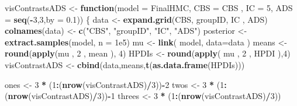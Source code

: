 \documentclass[10pt,dvipsnames,enabledeprecatedfontcommands]{scrartcl}
\newenvironment{Shaded}{\begin{snugshade}}{\end{snugshade}}
\newcommand{\KeywordTok}[1]{\textcolor[rgb]{0.13,0.29,0.53}{\textbf{#1}}}
\newcommand{\DataTypeTok}[1]{\textcolor[rgb]{0.13,0.29,0.53}{#1}}
\newcommand{\DecValTok}[1]{\textcolor[rgb]{0.00,0.00,0.81}{#1}}
\newcommand{\FloatTok}[1]{\textcolor[rgb]{0.00,0.00,0.81}{#1}}
\newcommand{\StringTok}[1]{\textcolor[rgb]{0.31,0.60,0.02}{#1}}
\newcommand{\ControlFlowTok}[1]{\textcolor[rgb]{0.13,0.29,0.53}{\textbf{#1}}}
\newcommand{\OperatorTok}[1]{\textcolor[rgb]{0.81,0.36,0.00}{\textbf{#1}}}
\newcommand{\NormalTok}[1]{#1}
\begin{document}
\begin{Shaded}
\begin{Highlighting}[]
\NormalTok{visContrastsADS <-}\StringTok{ }\ControlFlowTok{function}\NormalTok{(}\DataTypeTok{model =}\NormalTok{ FinalHMC, }\DataTypeTok{CBS =}\NormalTok{ CBS , }\DataTypeTok{IC =}  \DecValTok{5}\NormalTok{, }
                            \DataTypeTok{ADS =} \KeywordTok{seq}\NormalTok{(}\OperatorTok{-}\DecValTok{3}\NormalTok{,}\DecValTok{3}\NormalTok{,}\DataTypeTok{by  =} \FloatTok{0.1}\NormalTok{))}
\NormalTok{\{}
\NormalTok{  data <-}\StringTok{ }\KeywordTok{expand.grid}\NormalTok{(CBS, groupID, IC , ADS)}
  \KeywordTok{colnames}\NormalTok{(data) <-}\StringTok{ }\KeywordTok{c}\NormalTok{(}\StringTok{"CBS"}\NormalTok{, }\StringTok{"groupID"}\NormalTok{, }\StringTok{"IC"}\NormalTok{, }\StringTok{"ADS"}\NormalTok{)}
\NormalTok{  posterior <-}\StringTok{ }\KeywordTok{extract.samples}\NormalTok{(model, }\DataTypeTok{n =} \FloatTok{1e5}\NormalTok{)}
\NormalTok{  mu <-}\StringTok{ }\KeywordTok{link}\NormalTok{( model, }\DataTypeTok{data=}\NormalTok{data ) }
\NormalTok{  means <-}\StringTok{  }\KeywordTok{round}\NormalTok{(}\KeywordTok{apply}\NormalTok{(mu , }\DecValTok{2}\NormalTok{ , mean ), }\DecValTok{4}\NormalTok{)}
\NormalTok{  HPDIs <-}\StringTok{ }\KeywordTok{round}\NormalTok{(}\KeywordTok{apply}\NormalTok{( mu , }\DecValTok{2}\NormalTok{ , HPDI ),}\DecValTok{4}\NormalTok{)}
\NormalTok{  visContrastADS <-}\StringTok{ }\KeywordTok{cbind}\NormalTok{(data,means,}\KeywordTok{t}\NormalTok{(}\KeywordTok{as.data.frame}\NormalTok{(HPDIs)))}


\NormalTok{  ones <-}\StringTok{ }\DecValTok{3} \OperatorTok{*}\StringTok{ }\NormalTok{(}\DecValTok{1}\OperatorTok{:}\NormalTok{(}\KeywordTok{nrow}\NormalTok{(visContrastADS)}\OperatorTok{/}\DecValTok{3}\NormalTok{))}\OperatorTok{-}\DecValTok{2}
\NormalTok{  twos <-}\StringTok{ }\DecValTok{3} \OperatorTok{*}\StringTok{ }\NormalTok{(}\DecValTok{1}\OperatorTok{:}\NormalTok{(}\KeywordTok{nrow}\NormalTok{(visContrastADS)}\OperatorTok{/}\DecValTok{3}\NormalTok{))}\OperatorTok{-}\DecValTok{1}
\NormalTok{  threes <-}\StringTok{ }\DecValTok{3} \OperatorTok{*}\StringTok{ }\NormalTok{(}\DecValTok{1}\OperatorTok{:}\NormalTok{(}\KeywordTok{nrow}\NormalTok{(visContrastADS)}\OperatorTok{/}\DecValTok{3}\NormalTok{))}
  

\end{Highlighting}
\end{Shaded}
\end{document}
